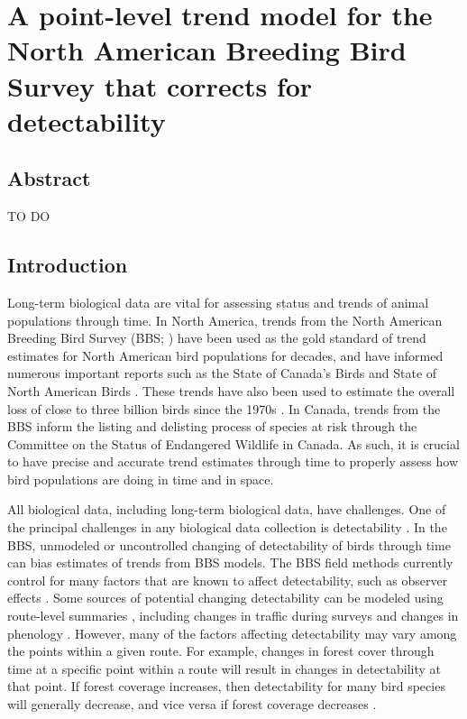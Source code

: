 \chapter{A point-level trend model for the North American Breeding Bird Survey that corrects for detectability}

\section{Abstract}
\par TO DO
	
\section{Introduction}

\par Long-term biological data are vital for assessing status and trends of animal populations through time.
In North America, trends from the North American Breeding Bird Survey (BBS; \citet{sauer_first_2017, hudson_role_2017}) have been used as the gold standard of trend estimates for North American bird populations for decades, and have informed numerous important reports such as the State of Canada's Birds \citep{north_american_bird_conservation_initiative_canada_state_2019} and State of North American Birds \citep{north_american_bird_conservation_initiative_canada_state_2022}.
These trends have also been used to estimate the overall loss of close to three billion birds since the 1970s \citep{rosenberg_decline_2019}.
In Canada, trends from the BBS inform the listing and delisting process of species at risk through the Committee on the Status of Endangered Wildlife in Canada.
As such, it is crucial to have precise and accurate trend estimates through time to properly assess how bird populations are doing in time and in space.

\par All biological data, including long-term biological data, have challenges.
One of the principal challenges in any biological data collection is detectability \citep{bennett_how_2024}.
In the BBS, unmodeled or uncontrolled changing of detectability of birds through time can bias estimates of trends from BBS models.
The BBS field methods currently control for many factors that are known to affect detectability, such as observer effects \citet{sauer_observer_1994}.
Some sources of potential changing detectability can be modeled using route-level summaries \cite{smith_patterns_2023}, including changes in traffic during surveys \citep{griffith_traffic_2010} and changes in phenology \citep{english_current_2021}.
However, many of the factors affecting detectability may vary among the points within a given route.
For example, changes in forest cover through time at a specific point within a route will result in changes in detectability at that point.
If forest coverage increases, then detectability for many bird species will generally decrease, and vice versa if forest coverage decreases \citep{edwards_point_2023, yip_sound_2017}.


